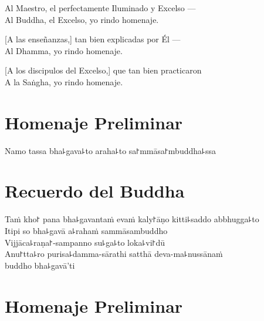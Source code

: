 Al Maestro, el perfectamente Iluminado y Excelso ---\\
Al Buddha, el Excelso, yo rindo homenaje. 

[A las enseñanzas,] tan bien explicadas por Él ---\\
 Al Dhamma, yo rindo homenaje. 

[A los discipulos del Excelso,] que tan bien practicaron\\
A la Saṅgha, yo rindo homenaje. 

\clearpage

\chapter*{Homenaje Preliminar}

\begin{leader}
\end{leader}

Namo tassa bha꜕gava꜕to araha꜕to sa꜓mmāsa꜓mbuddha꜕ssa


\chapter*{Recuerdo del Buddha}

\delegateSetUseNext

\begin{leader}
\end{leader}

Taṁ kho꜓ pana bha꜕gavantaṁ evaṁ kaly꜓āṇo kitti꜕saddo abbhugga꜕to\\
Itipi so bha꜕gavā a꜕rahaṁ sammāsambuddho\\
Vijjāca꜕raṇa꜓-sampanno su꜕ga꜕to loka꜕vi꜓dū\\
Anu꜓tta꜕ro purisa꜕damma-sārathi satthā deva-ma꜕nussānaṁ\\
\vin buddho bha꜕gavā'ti

\clearpage

\chapter{Homenaje Preliminar}

\begin{leader}
\end{leader}

